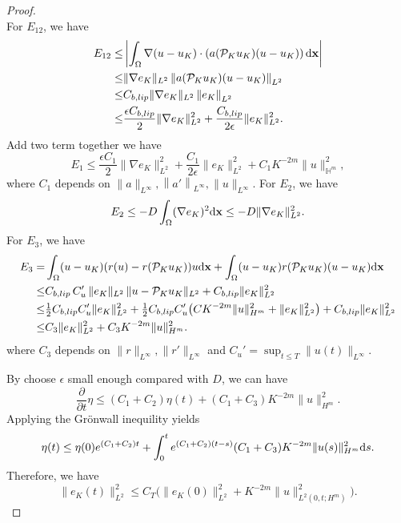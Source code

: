 \documentclass[a4paper,fleqn]{cas-sc}
\theoremstyle{definition}
\theoremstyle{remark}
\begin{document}
\begin{proof}
\[\]
For $E_{12}$, we have 
\[
\begin{aligned}
    E_{12} \leq& \left| \int_\Omega \nabla(u-u_K) \cdot \left(a(\mathcal P_K u_K )(u  - u_K )\right)\mathrm{d} \mathbf{x} \right|\\
    \leq& \|\nabla e_K\|_{L^2}\left\|a(\mathcal P_K u_K )(u  - u_K ) \right\|_{L^2} \\
    \leq& C_{b,lip} \|\nabla e_K\|_{L^2}\left\|e_K \right\|_{L^2} \\
    \leq& \frac{\epsilon C_{b,lip}}{2}\|\nabla e_K\|_{L^2}^2 +\frac{C_{b,lip}}{2\epsilon}\|e_K\|_{L^2}^2.
\end{aligned}
\]
Add two term together we have 
\[
E_1 \leq \frac{\epsilon C_1}{2}\|\nabla e_K\|_{L^2}^2 +\frac{C_1}{2\epsilon}\| e_K\|_{L^2}^2 + C_1 K^{-2m}\|u\|_{\mathbb H^m}^2,
\]
where $C_1$  depends on $ \|a\|_{L^\infty},\left\|a'\right\|_{L^\infty},\|u\|_{L^\infty}$.
For $E_2$, we have 
\[
E_2 \leq - D\int_\Omega (\nabla e_K )^2\mathrm{d} \mathbf{x} \leq -D\|\nabla e_K\|^2_{L^2}.
\]
For $E_3$, we have 
\[
\begin{aligned}
    E_3 = &   \int_\Omega (u-u_K)  (r(u) - r(\mathcal P_K  u_K )) u \mathrm{d} \mathbf{x} 
     +  \int_\Omega (u-u_K)  r(\mathcal P_K  u_K ) (u-u_K) \mathrm{d} \mathbf{x} \\
    \leq & C_{b,lip}\,C_u'\,\|e_K\|_{L^2}\,\|u-\mathcal P_K u_K\|_{L^2 }
     +C_{b,lip} \|e_K\|_{L^2}^2\\
    \leq & \tfrac{1}{2}C_{b,lip}C_u' \|e_K\|_{L^2} ^2 + \tfrac{1}{2}C_{b,lip}C_u'\bigl( C K^{-2m} \|u\|_{H^m}^2 + \|e_K\|_{L^2}^2\bigr)
     +C_{b,lip} \|e_K\|_{L^2}^2\\
    \leq & C_3 \|e_K\|_{L^2}^2+ C_3 K^{-2m} \|u\|_{H^m}^2.
\end{aligned}
\]
where $C_3$ depends on $\|r\|_{L^\infty},\|r'\|_{L^\infty}$ and $C_u'=\sup_{t\le T}\|u(t)\|_{L^\infty}$.

By choose $\epsilon$ small enough compared with $D$, we can have
\[
\frac{\partial }{\partial t }\eta \leq(C_1+C_2)\eta(t) + (C_1+C_3) K^{-2m} \|u\|_{H^m}^2.
\]
Applying the Gr\"onwall inequility yields
$$\eta(t) \le \eta(0)e^{(C_1+C_2)t} + \int_0^t e^{(C_1+C_2)(t-s)} (C_1+C_3) K^{-2m} \|u(s)\|_{H^m}^2 \mathrm{d} s.$$
Therefore, we have
$$\|e_K(t)\|_{L^2}^2 \le C_T \Big( \|e_K(0)\|_{L^2}^2 + K^{-2m} \|u\|_{L^2(0,t;H^m)}^2 \Big).$$
\end{proof}
\end{document}
